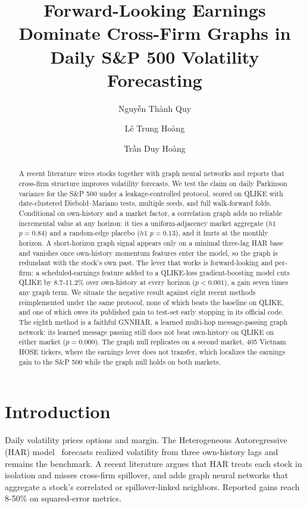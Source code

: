 \documentclass{llncs}
\begin{document}
\title{Forward-Looking Earnings Dominate Cross-Firm Graphs in Daily S\&P 500 Volatility Forecasting}

\author{Nguyễn Thành Quy \and Lê Trung Hoàng \and Trần Duy Hoàng}

\maketitle

\begin{abstract}
A recent literature wires stocks together with graph neural networks and reports that cross-firm structure
improves volatility forecasts. We test the claim on daily Parkinson variance for the S\&P 500 under a
leakage-controlled protocol, scored on QLIKE with date-clustered Diebold--Mariano tests, multiple seeds, and full
walk-forward folds. Conditional on own-history and a market factor, a correlation graph adds no reliable
incremental value at any horizon: it ties a uniform-adjacency market aggregate ($h1$ $p=0.84$) and a random-edge
placebo ($h1$ $p=0.13$), and it hurts at the monthly horizon. A short-horizon graph signal appears only on a minimal
three-lag HAR base and vanishes once own-history momentum features enter the model, so the graph is redundant with
the stock's own past. The lever that works is forward-looking and per-firm: a scheduled-earnings feature added to
a QLIKE-loss gradient-boosting model cuts QLIKE by 8.7-11.2\% over own-history at every horizon ($p<0.001$), a gain
seven times any graph term. We situate the negative result against eight recent methods reimplemented under the
same protocol, none of which beats the baseline on QLIKE, and one of which owes its published gain to test-set
early stopping in its official code. The eighth method is a faithful GNNHAR, a learned multi-hop message-passing
graph network: its learned message passing still does not beat own-history on QLIKE on either market ($p=0.000$).
The graph null replicates on a second market, 405 Vietnam HOSE tickers, where the earnings lever does not transfer,
which localizes the earnings gain to the S\&P 500 while the graph null holds on both markets.
\end{abstract}

\section{Introduction}
Daily volatility prices options and margin. The Heterogeneous Autoregressive (HAR) model~\cite{corsi2009} forecasts realized
volatility from three own-history lags and remains the benchmark. A recent literature argues that HAR treats each
stock in isolation and misses cross-firm spillover, and adds graph neural networks that aggregate a stock's
correlated or spillover-linked neighbors. Reported gains reach 8-50\% on squared-error metrics.
\end{document}
